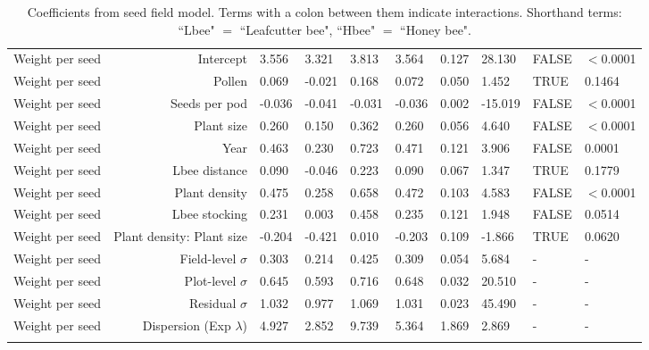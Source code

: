 \begin{landscape}
\begin{longtable}{|r|r|l|l|l|l|l|l|l|l|}
    \hline
    Weight per seed & Intercept & 3.556 & 3.321 & 3.813 & 3.564 & 0.127 & 28.130 & FALSE & $<$0.0001 \\ 
    Weight per seed & Pollen & 0.069 & -0.021 & 0.168 & 0.072 & 0.050 & 1.452 & TRUE & 0.1464 \\ 
    Weight per seed & Seeds per pod & -0.036 & -0.041 & -0.031 & -0.036 & 0.002 & -15.019 & FALSE & $<$0.0001 \\ 
    Weight per seed & Plant size & 0.260 & 0.150 & 0.362 & 0.260 & 0.056 & 4.640 & FALSE & $<$0.0001 \\ 
    Weight per seed & Year & 0.463 & 0.230 & 0.723 & 0.471 & 0.121 & 3.906 & FALSE & 0.0001 \\ 
    Weight per seed & Lbee distance  & 0.090 & -0.046 & 0.223 & 0.090 & 0.067 & 1.347 & TRUE & 0.1779 \\ 
    Weight per seed & Plant density & 0.475 & 0.258 & 0.658 & 0.472 & 0.103 & 4.583 & FALSE & $<$0.0001 \\ 
    Weight per seed & Lbee stocking & 0.231 & 0.003 & 0.458 & 0.235 & 0.121 & 1.948 & FALSE & 0.0514 \\ 
    Weight per seed & Plant density: Plant size & -0.204 & -0.421 & 0.010 & -0.203 & 0.109 & -1.866 & TRUE & 0.0620 \\ 
    Weight per seed & Field-level $\sigma$ & 0.303 & 0.214 & 0.425 & 0.309 & 0.054 & 5.684 & - & - \\ 
    Weight per seed & Plot-level $\sigma$  & 0.645 & 0.593 & 0.716 & 0.648 & 0.032 & 20.510 & - & - \\ 
    Weight per seed & Residual $\sigma$ & 1.032 & 0.977 & 1.069 & 1.031 & 0.023 & 45.490 & - & - \\ 
    Weight per seed & Dispersion (Exp $\lambda$) & 4.927 & 2.852 & 9.739 & 5.364 & 1.869 & 2.869 & - & - \\  \hline
    
    \caption[Coefficients from seed field model]{Coefficients from seed field model. Terms with a colon between them indicate interactions. Shorthand terms: ``Lbee" $=$ ``Leafcutter bee", ``Hbee" $=$ ``Honey bee".}
    \label{tab:seedCoefTab}  
\end{longtable}

\end{landscape}